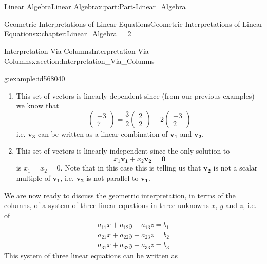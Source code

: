 \documentclass[oneside,10pt,]{book}
\numberwithin{equation}{section}
\begin{document}
\begin{partptx}{Linear Algebra}{}{Linear Algebra}{}{}{x:part:Part-Linear_Algebra}
\begin{chapterptx}{Geometric Interpretations of Linear Equations}{}{Geometric Interpretations of Linear Equations}{}{}{x:chapter:Linear_Algebra__2}
\begin{sectionptx}{Interpretation Via Columns}{}{Interpretation Via Columns}{}{}{x:section:Interpretation_Via_Columns}
\begin{example}{}{g:example:id568040}
\noindent\hypertarget{g:solution:id568033}{}%
\begin{enumerate}[label=(\alph*).]
\item{}This set of vectors is linearly dependent since (from our previous examples) we know that%
\begin{equation*}
\begin{pmatrix} -3 \\ 7 \end{pmatrix}=\frac{3}{2} \begin{pmatrix} 2 \\ 2 \end{pmatrix}+2\begin{pmatrix} -3 \\ 2 \end{pmatrix}
\end{equation*}
i.e. \(\mathbf{v_3}\) can be written as a linear combination of \(\mathbf{v_1}\) and \(\mathbf{v_2}\).%
\item{}This set of vectors is linearly independent since the only solution to%
\begin{equation*}
x_1\mathbf{v_1}+x_2\mathbf{v_2}=\mathbf{0}
\end{equation*}
is \(x_1=x_2=0\). Note that in this case this is telling us that \(\mathbf{v_2}\) is not a scalar multiple of \(\mathbf{v_1}\), i.e. \(\mathbf{v_2}\) is not parallel to \(\mathbf{v_1}\).%
\end{enumerate}
%
\end{example}
We are now ready to discuss the geometric interpretation, in terms of the columns, of a system of three linear equations in three unknowns \(x\), \(y\) and \(z\), i.e. of%
\begin{gather*}
a_{11}x+a_{12}y+a_{13}z=b_1\\
a_{21}x+a_{22}y+a_{23}z=b_2\\
a_{31}x+a_{32}y+a_{33}z=b_3
\end{gather*}
This system of three linear equations can be written as%
\begin{equation*}

\end{equation*}
\end{sectionptx}
\end{chapterptx}
\end{partptx}
\end{document}
